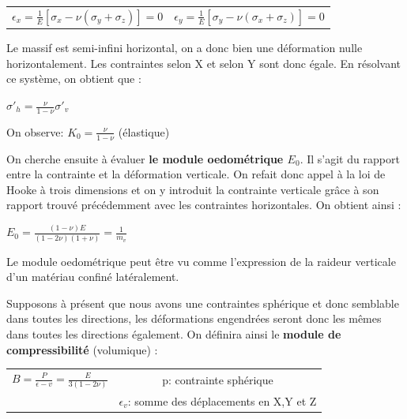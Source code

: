         \begin{center}
            \begin{tabular}{cc}
                $\epsilon_x = \frac{1}{E}[\sigma_x - \nu (\sigma_y + \sigma_z)] = 0$ \: \: &
                $\epsilon_y = \frac{1}{E}[\sigma_y - \nu (\sigma_x + \sigma_z)] = 0$
            \end{tabular}
        \end{center}
        
        Le massif est semi-infini horizontal, on a donc bien une déformation nulle horizontalement. Les contraintes selon X et selon Y sont donc égale. En résolvant ce système, on obtient que :
        
        \begin{center}
            $\sigma'_h = \frac{\nu}{1-\nu} \sigma'_v$
        \end{center}
        
        On observe: $K_0 = \frac{\nu}{1-\nu}$ (élastique) 
        
        On cherche ensuite à évaluer \textbf{le module oedométrique $E_0$}. Il s'agit du rapport entre la contrainte et la déformation verticale. On refait donc appel à la loi de Hooke à trois dimensions et on y introduit la contrainte verticale grâce à son rapport trouvé précédemment avec les contraintes horizontales. On obtient ainsi :
        
        \begin{center}
            $E_0 = \frac{(1-\nu)E}{(1-2\nu)(1+\nu)} = \frac{1}{m_v}$
        \end{center}
        
        Le module oedométrique peut être vu comme l'expression de la raideur verticale d'un matériau confiné latéralement. 
        
        Supposons à présent que nous avons une contraintes sphérique et donc semblable dans toutes les directions, les déformations engendrées seront donc les mêmes dans toutes les directions également. On définira ainsi le \textbf{module de compressibilité} (volumique) :
        
        \medskip
        \begin{center}
        \begin{tabular}{c|c}
            $B = \frac{P}{\epsilon-v} = \frac{E}{3(1-2\nu)}$  &  p: contrainte sphérique  \\
                          &  $\epsilon_v$: somme des déplacements en X,Y et Z 
        \end{tabular}
        \end{center}
        
